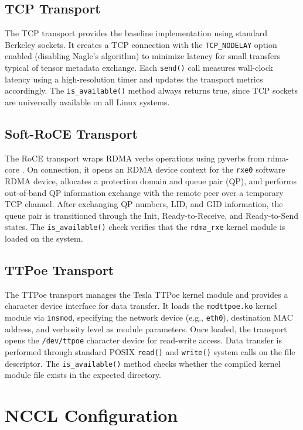 \documentclass[10pt,letterpaper]{article}
\begin{document}
\subsection{TCP Transport}

The TCP transport provides the baseline implementation using standard Berkeley sockets. It creates a TCP connection with the \texttt{TCP\_NODELAY} option enabled (disabling Nagle's algorithm) to minimize latency for small transfers typical of tensor metadata exchange. Each \texttt{send()} call measures wall-clock latency using a high-resolution timer and updates the transport metrics accordingly. The \texttt{is\_available()} method always returns true, since TCP sockets are universally available on all Linux systems.

\subsection{Soft-RoCE Transport}

The RoCE transport wraps RDMA verbs operations using pyverbs from rdma-core \cite{rdma-core}. On connection, it opens an RDMA device context for the \texttt{rxe0} software RDMA device, allocates a protection domain and queue pair (QP), and performs out-of-band QP information exchange with the remote peer over a temporary TCP channel. After exchanging QP numbers, LID, and GID information, the queue pair is transitioned through the Init, Ready-to-Receive, and Ready-to-Send states. The \texttt{is\_available()} check verifies that the \texttt{rdma\_rxe} kernel module is loaded on the system.

\subsection{TTPoe Transport}

The TTPoe transport manages the Tesla TTPoe kernel module \cite{ttpoe-repo} and provides a character device interface for data transfer. It loads the \texttt{modttpoe.ko} kernel module via \texttt{insmod}, specifying the network device (e.g., \texttt{eth0}), destination MAC address, and verbosity level as module parameters. Once loaded, the transport opens the \texttt{/dev/ttpoe} character device for read-write access. Data transfer is performed through standard POSIX \texttt{read()} and \texttt{write()} system calls on the file descriptor. The \texttt{is\_available()} method checks whether the compiled kernel module file exists in the expected directory.

\section{NCCL Configuration}
\end{document}
